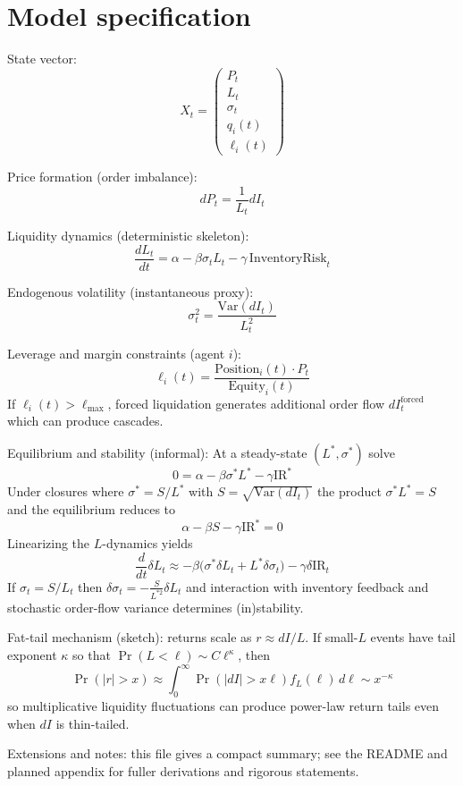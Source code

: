 \documentclass{article}
\begin{document}
\section*{Model specification}

State vector:
\[
X_t = \begin{pmatrix} P_t \\ L_t \\ \sigma_t \\ q_i(t) \\ \ell_i(t) \end{pmatrix}
\]

Price formation (order imbalance):
\[
dP_t = \frac{1}{L_t} dI_t
\]

Liquidity dynamics (deterministic skeleton):
\[
\frac{dL_t}{dt} = \alpha - \beta \sigma_t L_t - \gamma \, \mathrm{InventoryRisk}_t
\]

Endogenous volatility (instantaneous proxy):
\[
\sigma_t^2 = \frac{\mathrm{Var}(dI_t)}{L_t^2}
\]

Leverage and margin constraints (agent $i$):
\[
\ell_i(t) = \frac{\text{Position}_i(t) \cdot P_t}{\text{Equity}_i(t)}
\]
If $\ell_i(t)>\ell_{\max}$, forced liquidation generates additional order flow $dI_t^{\mathrm{forced}}$ which can produce cascades.

Equilibrium and stability (informal):
At a steady-state $(L^*,\sigma^*)$ solve
\[
0 = \alpha - \beta \sigma^* L^* - \gamma \mathrm{IR}^*
\]
Under closures where $\sigma^*=S/L^*$ with $S=\sqrt{\mathrm{Var}(dI_t)}$ the product $\sigma^* L^*=S$ and the equilibrium reduces to
\[
\alpha - \beta S - \gamma \mathrm{IR}^* = 0
\]
Linearizing the $L$-dynamics yields
\[
\frac{d}{dt} \delta L_t \approx -\beta \big( \sigma^* \delta L_t + L^* \delta \sigma_t \big) - \gamma \delta \mathrm{IR}_t
\]
If $\sigma_t=S/L_t$ then $\delta \sigma_t = -\frac{S}{L^{*2}} \delta L_t$ and interaction with inventory feedback and stochastic order-flow variance determines (in)stability.

Fat-tail mechanism (sketch): returns scale as $r \approx dI / L$. If small-$L$ events have tail exponent $\kappa$ so that $\Pr(L<\ell)\sim C \ell^{\kappa}$, then
\[
\Pr(|r|>x) \approx \int_0^{\infty} \Pr(|dI|>x \ell) f_L(\ell) \, d\ell \sim x^{-\kappa}
\]
so multiplicative liquidity fluctuations can produce power-law return tails even when $dI$ is thin-tailed.

Extensions and notes: this file gives a compact summary; see the README and planned appendix for fuller derivations and rigorous statements.
\end{document}
